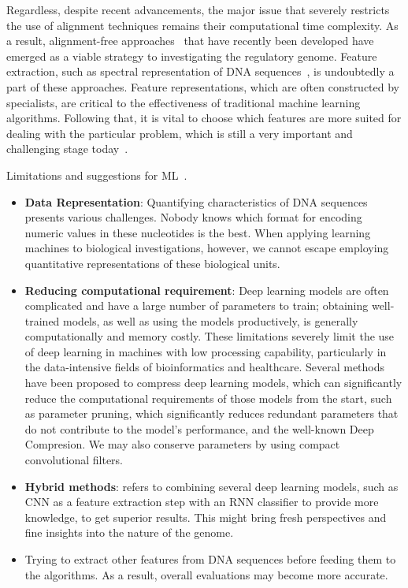 Regardless, despite recent advancements, the major issue that severely restricts the use of alignment techniques remains their computational time complexity. As a result, alignment-free approaches~\cite{Vinga2003Alignment-freeReview,Pinello2014ApplicationsEpigenomics} that have recently been developed have emerged as a viable strategy to investigating the regulatory genome. Feature extraction, such as spectral representation of DNA sequences~\cite{LoBosco2014ASequences,LoBosco2015AlignmentClassification}, is undoubtedly a part of these approaches. Feature representations, which are often constructed by specialists, are critical to the effectiveness of traditional machine learning algorithms. Following that, it is vital to choose which features are more suited for dealing with the particular problem, which is still a very important and challenging stage today~\cite{LoBosco2017DeepClassification}.

Limitations and suggestions for \gls{ML}~\cite{AbdAlhalem2021DNASurvey}.

\begin{itemize}
    \item \textbf{Data Representation}: Quantifying characteristics of DNA sequences presents various challenges. Nobody knows which format for encoding numeric values in these nucleotides is the best. When applying learning machines to biological investigations, however, we cannot escape employing quantitative representations of these biological units.
    
    \item \textbf{Reducing computational requirement}: Deep learning models are often complicated and have a large number of parameters to train; obtaining well-trained models, as well as using the models productively, is generally computationally and memory costly. These limitations severely limit the use of deep learning in machines with low processing capability, particularly in the data-intensive fields of bioinformatics and healthcare. Several methods have been proposed to compress deep learning models, which can significantly reduce the computational requirements of those models from the start, such as parameter pruning, which significantly reduces redundant parameters that do not contribute to the model's performance, and the well-known Deep Compresion. We may also conserve parameters by using compact convolutional filters.
    
    \item \textbf{Hybrid methods}: refers to combining several deep learning models, such as CNN as a feature extraction step with an RNN classifier to provide more knowledge, to get superior results. This might bring fresh perspectives and fine insights into the nature of the genome. 
    
    \item Trying to extract other features from DNA sequences before feeding them to the algorithms. As a result, overall evaluations may become more accurate.
\end{itemize}

